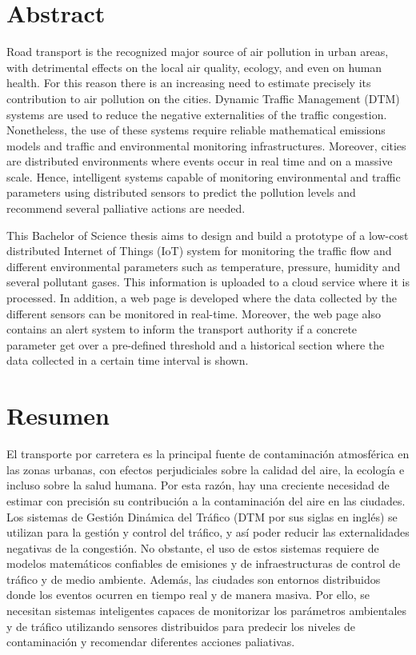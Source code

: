 
\chapter{Abstract}

Road transport is the recognized major source of air pollution in urban areas, with detrimental effects on the local air quality, ecology, and even on human health. For this reason there is an increasing need to estimate precisely its contribution to air pollution on the cities. Dynamic Traffic Management (DTM) systems are used to reduce the negative externalities of the traffic congestion. Nonetheless, the use of these systems require reliable mathematical emissions models and traffic and environmental monitoring infrastructures. Moreover, cities are distributed environments where events occur in real time and on a massive scale. Hence, intelligent systems capable of monitoring environmental and traffic parameters using distributed sensors to predict the pollution levels and recommend several palliative actions are needed.

This Bachelor of Science thesis aims to design and build a prototype of a low-cost distributed Internet of Things (IoT) system for monitoring the traffic flow and different environmental parameters such as temperature, pressure, humidity and several pollutant gases. This information is uploaded to a cloud service where it is processed. In addition, a web page is developed where the data collected by the different sensors can be monitored in real-time. Moreover, the web page also contains an alert system to inform the transport authority if a concrete parameter get over a pre-defined threshold and a historical section where the data collected in a certain time interval is shown.


\chapter{Resumen}

El transporte por carretera es la principal fuente de contaminación atmosférica en las zonas urbanas, con efectos perjudiciales sobre la calidad del aire, la ecología e incluso sobre la salud humana. Por esta razón, hay una creciente necesidad de estimar con precisión su contribución a la contaminación del aire en las ciudades. Los sistemas de Gestión Dinámica del Tráfico (DTM por sus siglas en inglés) se utilizan para la gestión y control del tráfico, y así poder reducir las externalidades negativas de la congestión. No obstante, el uso de estos sistemas requiere de modelos matemáticos confiables de emisiones y de infraestructuras de control de tráfico y de medio ambiente. Además, las ciudades son entornos distribuidos donde los eventos ocurren en tiempo real y de manera masiva. Por ello, se necesitan sistemas inteligentes capaces de monitorizar los parámetros ambientales y de tráfico utilizando sensores distribuidos para predecir los niveles de contaminación y recomendar diferentes acciones paliativas.

